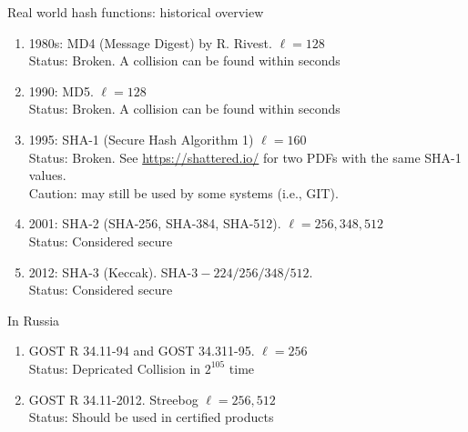 \documentclass[usenames,dvipsnames, 9pt]{beamer}
\begin{document}
\begin{frame}{Real world hash functions: historical overview}
\large
	\begin{enumerate}
		\itemsep7pt
		\item 1980s: MD4 (Message Digest) by R. Rivest.  {\color{Orange} $\ell = 128$} \\
		Status: {\color{Orange} Broken}. A collision can be found within seconds
		\pause
		\item 1990: MD5. {\color{Orange} $\ell = 128$} \\
		Status: {\color{Orange} Broken}. A collision can be found within seconds
		\pause
		\item 1995: SHA-1 (Secure Hash Algorithm 1) {\color{Orange} $\ell = 160$ } \\
		Status: {\color{Orange} Broken}. See \url{https://shattered.io/} for two PDFs with the same SHA-1 values. \\
		{\color{Orange} Caution:} may still be used by some systems (i.e., GIT).
		\pause
		\item 2001: SHA-2 (SHA-256, SHA-384, SHA-512). {\color{Orange} $\ell=256, 348, 512$} \\
		Status: {\color{Orange} Considered secure}
		\pause
		\item 2012: SHA-3 (Keccak). SHA-$3-224/256/348/512$. \\
		Status: {\color{Orange} Considered secure}
	\end{enumerate}
\pause
In Russia

	\begin{enumerate}
			\item GOST R 34.11-94 and GOST 34.311-95. {\color{Orange} $\ell = 256$} \\
			 Status: {\color{Orange} Depricated}  Collision  in $2^{105}$ time
			\item  GOST R 34.11-2012. Streebog {\color{Orange} $\ell = 256, 512$} \\
			 Status: {\color{Orange} Should be used in certified products}  
	\end{enumerate}
\end{frame}
\end{document}
